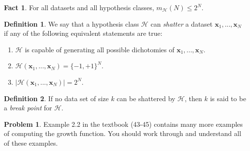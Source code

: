 \documentclass[10pt]{exam}
\theoremstyle{definition}
\newtheorem{problem}{Problem}
\newtheorem{defn}{Definition}
\newtheorem{fact}{Fact}
\newcommand{\R}{\mathbb R}
\newcommand{\x}{\mathbf x}
\newcommand{\mH}{m_{\mathcal H}}
\begin{document}
\begin{fact}
    For all datasets and all hypothesis classes,
        $
        \mH(N) \le 2^N.
        $
\end{fact}
\vspace{2in}

\begin{defn}
    We say that a hypothesis class $\mathcal H$ can \emph{shatter} a dataset $\x_1, ..., \x_N$ if any of the following equivalent statements are true:
    \begin{enumerate}
        \item $\mathcal H$ is capable of generating all possible dichotomies of $\x_1, ..., \x_N$.
        \item $\mathcal H(\x_1, ..., \x_N) = \{-1, +1\}^N$.
        \item $\left|\mathcal H(\x_1, ..., \x_N)\right| = 2^N$.
    \end{enumerate}
\end{defn}
\begin{defn}
    If no data set of size $k$ can be shattered by $\mathcal H$, then $k$ is said to be a \emph{break point} for $\mathcal H$.
\end{defn}

\vspace{6in}
\begin{problem}
    Example 2.2 in the textbook (43-45) contains many more examples of computing the growth function.
    You should work through and understand all of these examples.
\end{problem}
\newpage


\end{document}
